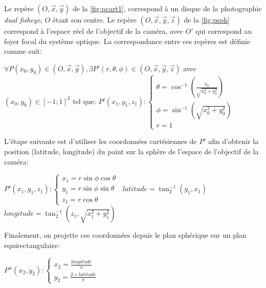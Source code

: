 			\par
			Le repère $(O,\vec{x},\vec{y})$ de la \autoref{fig:pcart1}, correspond à un disque de la photographie \emph{dual fisheye}, $O$ étant son centre.
			Le repère $(O,\vec{x},\vec{y},\vec{z})$ de la \autoref{fig:psph} correspond à l'espace réel de l'objectif de la caméra, avec $O'$ qui correspond au foyer focal du système optique.
			La correspondance entre ces repères est définie comme suit:
			\begin{center}
				$\forall P(x_{0},y_{0}) \in (O,\vec{x},\vec{y}), \exists P'(r,\theta,\phi) \in (O,\vec{x},\vec{y},\vec{z})$ avec $(x_{0},y_{0}) \in [-1;1]^2$ tel que: \newline
				$P'(x_{1},y_{1},z_{1}): \left\{
				\begin{array}{ll}
				\theta = \cos^{-1}{\left(\frac{x_{0}}{\sqrt{x_{0}^2+y_{0}^2}}\right)} \\
				\phi = \sin^{-1}{\left(\sqrt{x_{0}^2+y_{0}^2}\right)} \\
				r = 1
				\end{array}
				\right.\ $
			\end{center}
			L'étape suivante est d'utiliser les coordonnées cartésiennes de $P'$ afin d'obtenir la position (latitude, longitude) du point sur la sphère de l'espace de l'objectif de la caméra:
			\begin{center}
				$P'(x_{1},y_{1},z_{1}): \left\{
				\begin{array}{ll}
				x_{1} = r \sin \phi \cos \theta \\
				y_{1} = r \sin \phi \sin \theta \\
				z_{1} = r \cos \theta
				\end{array}
				\right.\ $ \newline \newline
				$ latitude = \tan^{-1}_{2}\left(y_{1}, x_{1}\right) $ \newline
				$ longitude = \tan^{-1}_{2}\left(z_{1}, \sqrt{x_{1}^2+y_{1}^2}\right) $ \newline
			\end{center}
			Finalement, on projette ces coordonnées depuis le plan sphérique sur un plan equirectangulaire:
			\begin{center}
				$P''(x_{2},y_{2}): \left\{
				\begin{array}{ll}
				x_{2} = \frac{longitude}{\pi} \\
				y_{2} = \frac{2 \times latitude}{\pi}
				\end{array}
				\right.\ $ \newline \newline
			\end{center}
		
